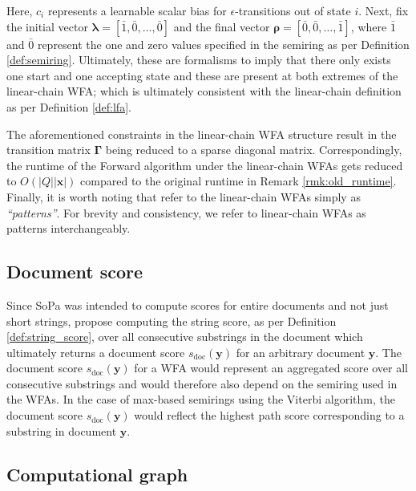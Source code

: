 Here, $c_i$ represents a learnable scalar bias for $\epsilon$-transitions out of
state $i$. Next, \citet{schwartz2018sopa} fix the initial vector $\bm{\lambda} =
[\bar{1}, \bar{0}, \ldots, \bar{0}]$ and the final vector $\bm{\rho} = [\bar{0},
\bar{0}, \ldots, \bar{1}]$, where $\bar{1}$ and $\bar{0}$ represent the one and
zero values specified in the semiring as per Definition \ref{def:semiring}.
Ultimately, these are formalisms to imply that there only exists one start and
one accepting state and these are present at both extremes of the linear-chain
WFA; which is ultimately consistent with the linear-chain definition as per Definition
\ref{def:lfa}.

The aforementioned constraints in the linear-chain WFA structure result in the
transition matrix $\bm{\Gamma}$ being reduced to a sparse diagonal matrix.
Correspondingly, the runtime of the Forward algorithm under the linear-chain
WFAs gets reduced to $O(|Q||\bm{x}|)$ compared to the original runtime in
Remark \ref{rmk:old_runtime}. Finally, it is worth noting that \citet[Page 3,
Section 3.1]{schwartz2018sopa} refer to the linear-chain WFAs simply as
\textit{``patterns''}. For brevity and consistency, we refer to linear-chain
WFAs as patterns interchangeably.

\subsection{Document score}

\label{section:sopa_doc_score}

Since SoPa was intended to compute scores for entire documents and not just
short strings, \citet[Page 3, Section 3.2]{schwartz2018sopa} propose computing
the string score, as per Definition \ref{def:string_score}, over all consecutive
substrings in the document which ultimately returns a document score
$s_{\text{doc}}(\bm{y})$ for an arbitrary document $\bm{y}$. The document score
$s_{\text{doc}}(\bm{y})$ for a WFA would represent an aggregated score over all
consecutive substrings and would therefore also depend on the semiring used in
the WFAs. In the case of max-based semirings using the Viterbi algorithm, the
document score $s_{\text{doc}}(\bm{y})$ would reflect the highest path score
corresponding to a substring in document $\bm{y}$.

\subsection{Computational graph}

